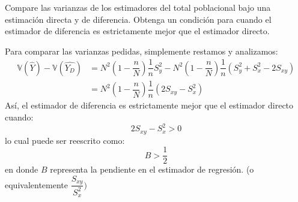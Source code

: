 
\addpoints

\question[10] Compare las varianzas de los estimadores del total poblacional bajo una estimación directa y de diferencia. Obtenga un condición para cuando el estimador de diferencia es estrictamente mejor que el estimador directo.

\begin{solution}
Para comparar las varianzas pedidas, simplemente restamos y analizamos:
\begin{align*}
\mathbb{V}(\hat{Y})-\mathbb{V}(\hat{Y_D})&= N^2 \left(1-\dfrac{n}{N}\right)\dfrac{1}{n}S_{y}^{2} - N^2 \left(1-\dfrac{n}{N}\right) \dfrac{1}{n} (S_{y}^{2}+S_{x}^{2}-2S_{xy})\\
&= N^2 \left(1-\dfrac{n}{N}\right)\dfrac{1}{n} (2S_{xy}-S_{x}^{2})
\end{align*}
Así, el estimador de diferencia es estrictamente mejor que el estimador directo cuando:
$$2S_{xy}-S_{x}^{2}>0$$
lo cual puede ser reescrito como:
$$B>\dfrac{1}{2}$$
en donde $B$ representa la pendiente en el estimador de regresión. (o equivalentemente $\dfrac{S_{xy}}{S_{x}^{2}})$
\end{solution}
